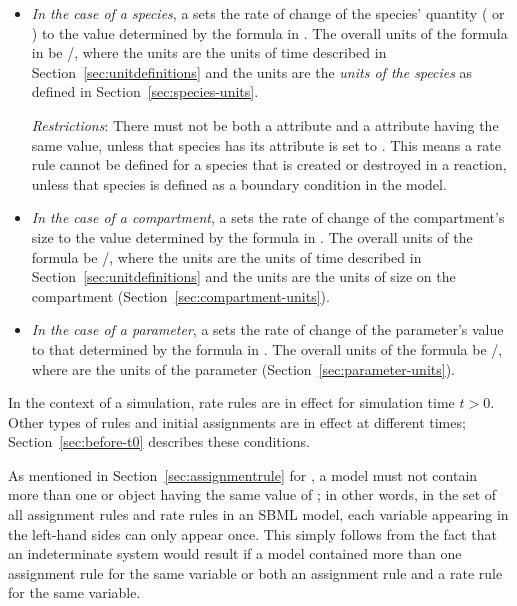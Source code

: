 \begin{itemize}
  
\item \emph{In the case of a species}, a \RateRule sets the rate
  of change of the species' quantity ( or
  ) to the value determined by the
  formula in .  The overall units of the formula in
    be /, where the  units are
  the  units of time described in
  Section~\ref{sec:unitdefinitions} and the  units are the \emph{units of the species} as defined
  in Section~\ref{sec:species-units}.
  
  \emph{Restrictions}: There must not be both a \RateRule
   attribute and a \SpeciesReference {}
  attribute having the same value, unless that species has its
   attribute is set to .  This
  means a rate rule cannot be defined for a species that is
  created or destroyed in a reaction, unless that species is
  defined as a boundary condition in the model.
  
\item \emph{In the case of a compartment}, a \RateRule sets the
  rate of change of the compartment's size to the value determined
  by the formula in .  The overall units of the
  formula  be /, where the
   units are the  units of time described
  in Section~\ref{sec:unitdefinitions} and the 
  units are the units of size on the compartment
  (Section~\ref{sec:compartment-units}).

\item \emph{In the case of a parameter}, a \RateRule sets the rate
  of change of the parameter's value to that determined by the
  formula in .  The overall units of the formula 
  be /, where  are the
  units of the parameter (Section~\ref{sec:parameter-units}).

\end{itemize}

In the context of a simulation, rate rules are in effect for
simulation time $t > 0$.  Other types of rules and initial
assignments are in effect at different times;
Section~\ref{sec:before-t0} describes these conditions.

As mentioned in Section~\ref{sec:assignmentrule} for
\AssignmentRule, a model must not contain more than one \RateRule
or \AssignmentRule object having the same value of
; in other words, in the set of all assignment
rules and rate rules in an SBML model, each variable appearing in
the left-hand sides can only appear once.  This simply follows
from the fact that an indeterminate system would result if a model
contained more than one assignment rule for the same variable or
both an assignment rule and a rate rule for the same variable.


